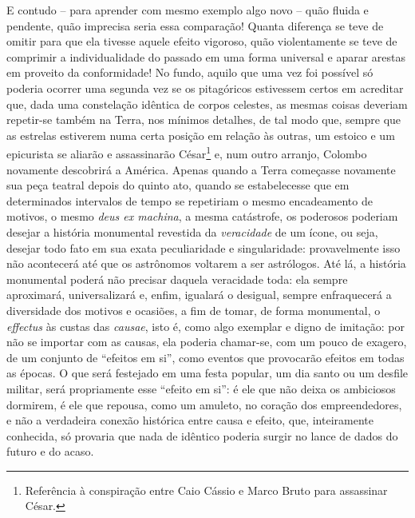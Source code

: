 E contudo -- para aprender com mesmo exemplo algo novo -- quão fluida e
pendente, quão imprecisa seria essa comparação! Quanta diferença se teve
de omitir para que ela tivesse aquele efeito vigoroso, quão
violentamente se teve de comprimir a individualidade do passado em uma
forma universal e aparar arestas em proveito da conformidade! No fundo,
aquilo que uma vez foi possível só poderia ocorrer uma segunda vez se os
pitagóricos estivessem certos em acreditar que, dada uma constelação
idêntica de corpos celestes, as mesmas coisas deveriam repetir-se também
na Terra, nos mínimos detalhes, de tal modo que, sempre que as estrelas
estiverem numa certa posição em relação às outras, um estoico e um
epicurista se aliarão e assassinarão César\footnote{Referência à conspiração entre
  Caio Cássio e Marco Bruto para assassinar César.} e, num outro arranjo, Colombo
novamente descobrirá a América. Apenas quando a
Terra começasse novamente sua peça teatral depois do quinto ato, quando
se estabelecesse que em determinados intervalos de tempo se repetiriam o
mesmo encadeamento de motivos, o mesmo \emph{deus ex machina}, a mesma
catástrofe, os poderosos poderiam desejar a história monumental
revestida da \emph{veracidade} de um ícone, ou seja, desejar todo fato
em sua exata peculiaridade e singularidade: provavelmente isso não
acontecerá até que os astrônomos voltarem a ser astrólogos. Até lá, a
história monumental poderá não precisar daquela veracidade toda: ela
sempre aproximará, universalizará e, enfim, igualará o desigual, sempre
enfraquecerá a diversidade dos motivos e ocasiões, a fim de tomar, de
forma monumental, o \emph{effectus} às custas das \emph{causae}, isto é,
como algo exemplar e digno de imitação: por não se importar com as
causas, ela poderia chamar-se, com um pouco de exagero, de um conjunto
de ``efeitos em si'', como eventos que provocarão efeitos em todas as
épocas. O que será festejado em uma festa popular, um dia santo ou um
desfile militar, será propriamente esse ``efeito em si'': é ele que não
deixa os ambiciosos dormirem, é ele que repousa, como um amuleto, no
coração dos empreendedores, e não a verdadeira conexão histórica entre
causa e efeito, que, inteiramente conhecida, só provaria que nada de
idêntico poderia surgir no lance de dados do futuro e do acaso.

